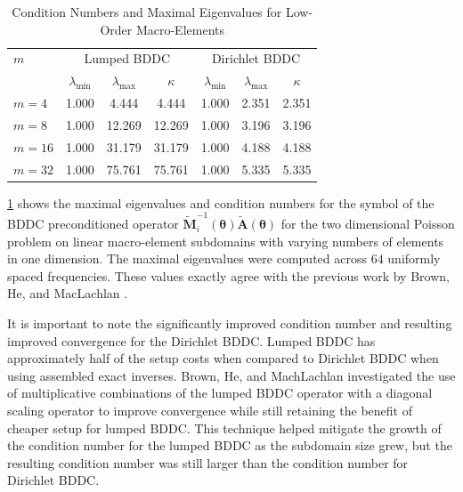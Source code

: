 \documentclass[review]{siamart190516}
\begin{document}
\begin{table}[ht!]
\begin{center}
\begin{tabular}{l ccc ccc}
  \toprule
  $m$  &  \multicolumn{3}{c}{Lumped BDDC}  &  \multicolumn{3}{c}{Dirichlet BDDC}  \\
                      &  $\lambda_{\min}$  &  $\lambda_{\max}$  &  $\kappa$ & $\lambda_{\min}$  &  $\lambda_{\max}$ & $\kappa$  \\
  \toprule
  $m = 4$   &  1.000  &   4.444  &   4.444  &  1.000  &  2.351  &  2.351  \\
  $m = 8$   &  1.000  &  12.269  &  12.269  &  1.000  &  3.196  &  3.196  \\
  $m = 16$  &  1.000  &  31.179  &  31.179  &  1.000  &  4.188  &  4.188  \\
  $m = 32$  &  1.000  &  75.761  &  75.761  &  1.000  &  5.335  &  5.335  \\
  \bottomrule
\end{tabular}
\end{center}
\caption{Condition Numbers and Maximal Eigenvalues for Low-Order Macro-Elements}
\label{table:macro_element_bddc}
\end{table}

\cref{table:macro_element_bddc} shows the maximal eigenvalues and condition numbers for the symbol of the BDDC preconditioned operator $\tilde{\mathbf{M}}^{-1}_i \left( \boldsymbol{\theta} \right) \tilde{\mathbf{A}} \left( \boldsymbol{\theta} \right)$ for the two dimensional Poisson problem on linear macro-element subdomains with varying numbers of elements in one dimension.
The maximal eigenvalues were computed across $64$ uniformly spaced frequencies.
These values exactly agree with the previous work by Brown, He, and MacLachlan \cite{brown2019local}.

It is important to note the significantly improved condition number and resulting improved convergence for the Dirichlet BDDC.
Lumped BDDC has approximately half of the setup costs when compared to Dirichlet BDDC when using assembled exact inverses.
Brown, He, and MachLachlan investigated the use of multiplicative combinations of the lumped BDDC operator with a diagonal scaling operator to improve convergence while still retaining the benefit of cheaper setup for lumped BDDC.
This technique helped mitigate the growth of the condition number for the lumped BDDC as the subdomain size grew, but the resulting condition number was still larger than the condition number for Dirichlet BDDC.
\end{document}
